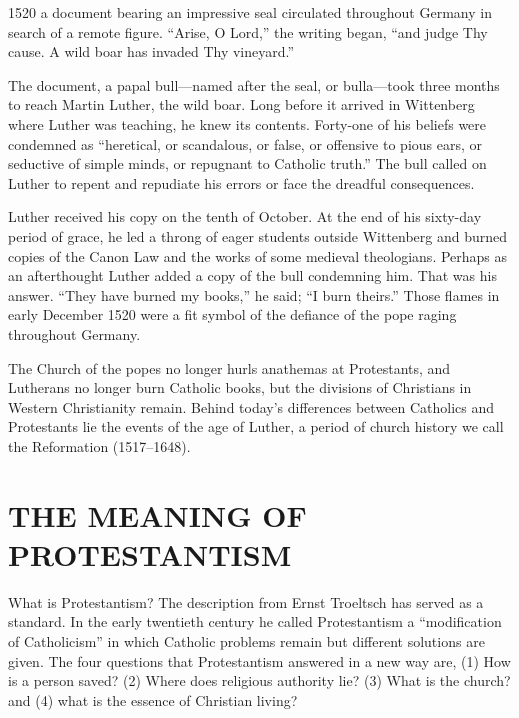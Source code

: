 
 1520 a document bearing an impressive seal circulated throughout Germany
in search of a remote figure. “Arise, O Lord,” the writing began, “and judge Thy cause. A wild boar
has invaded Thy vineyard.”

The document, a papal bull—named after the seal, or bulla—took three months to reach Martin Luther,
the wild boar. Long before it arrived in Wittenberg where Luther was teaching, he knew its contents.
Forty-one of his beliefs were condemned as “heretical, or scandalous, or false, or offensive to
pious ears, or seductive of simple minds, or repugnant to Catholic truth.” The bull called on Luther
to repent and repudiate his errors or face the dreadful consequences.

Luther received his copy on the tenth of October. At the end of his sixty-day period of grace, he
led a throng of eager students outside Wittenberg and burned copies of the Canon Law and the works
of some medieval theologians. Perhaps as an afterthought Luther added a copy of the bull condemning
him. That was his answer. “They have burned my books,” he said; “I burn theirs.” Those flames in
early December 1520 were a fit symbol of the defiance of the pope raging throughout Germany.

The Church of the popes no longer hurls anathemas at Protestants, and Lutherans no longer burn
Catholic books, but the divisions of Christians in Western Christianity remain. Behind today’s
differences between Catholics and Protestants lie the events of the age of Luther, a period of
church history we call the Reformation (1517–1648).

\section{THE MEANING OF PROTESTANTISM}

What is Protestantism? The description from Ernst Troeltsch has served as a standard. In the early
twentieth century he called Protestantism a “modification of Catholicism” in which Catholic problems
remain but different solutions are given. The four questions that Protestantism answered in a new
way are, (1) How is a person saved? (2) Where does religious authority lie? (3) What is the church?
and (4) what is the essence of Christian living?

